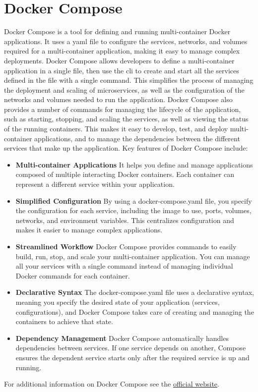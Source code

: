 \section {Docker Compose}
Docker Compose is a tool for defining and running multi-container Docker applications. It uses a \gls{yaml} file to configure the services, networks, and volumes required for a multi-container application, making it easy to manage complex deployments. Docker Compose allows developers to define a multi-container application in a single file, then use the \gls{cli} to create and start all the services defined in the file with a single command. This simplifies the process of managing the deployment and scaling of microservices, as well as the configuration of the networks and volumes needed to run the application. Docker Compose also provides a number of commands for managing the lifecycle of the application, such as starting, stopping, and scaling the services, as well as viewing the status of the running containers. This makes it easy to develop, test, and deploy multi-container applications, and to manage the dependencies between the different services that make up the application.
Key features of Docker Compose include:
\begin{itemize}
    \item \textbf{Multi-container Applications} It helps you define and manage applications composed of multiple interacting Docker containers. Each container can represent a different service within your application. 
    \item \textbf{Simplified Configuration} By using a docker-compose.yaml file, you specify the configuration for each service, including the image to use, ports, volumes, networks, and environment variables. This centralizes configuration and makes it easier to manage complex applications. 
    \item \textbf{Streamlined Workflow} Docker Compose provides commands to easily build, run, stop, and scale your multi-container application. You can manage all your services with a single command instead of managing individual Docker commands for each container. 
    \item \textbf{Declarative Syntax} The docker-compose.yaml file uses a declarative syntax, meaning you specify the desired state of your application (services, configurations), and Docker Compose takes care of creating and managing the containers to achieve that state. 
    \item \textbf{Dependency Management} Docker Compose automatically handles dependencies between services. If one service depends on another, Compose ensures the dependent service starts only after the required service is up and running. 
\end{itemize}
    For additional information on Docker Compose see the \href{https://docs.docker.com/compose/}{official website}.
